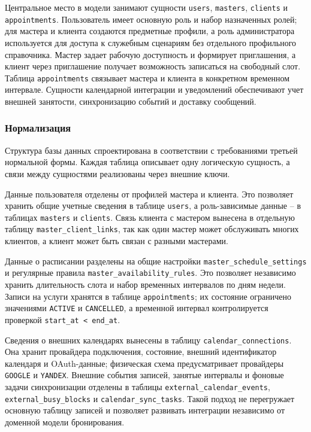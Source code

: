 Центральное место в модели занимают сущности \texttt{users}, \texttt{masters}, \texttt{clients} и \texttt{appointments}. Пользователь имеет основную роль и набор назначенных ролей; для мастера и клиента создаются предметные профили, а роль администратора используется для доступа к служебным сценариям без отдельного профильного справочника. Мастер задает рабочую доступность и формирует приглашения, а клиент через приглашение получает возможность записаться на свободный слот. Таблица \texttt{appointments} связывает мастера и клиента в конкретном временном интервале. Сущности календарной интеграции и уведомлений обеспечивают учет внешней занятости, синхронизацию событий и доставку сообщений.

\subsubsection{Нормализация}

Структура базы данных спроектирована в соответствии с требованиями третьей нормальной формы. Каждая таблица описывает одну логическую сущность, а связи между сущностями реализованы через внешние ключи.

Данные пользователя отделены от профилей мастера и клиента. Это позволяет хранить общие учетные сведения в таблице \texttt{users}, а роль-зависимые данные -- в таблицах \texttt{masters} и \texttt{clients}. Связь клиента с мастером вынесена в отдельную таблицу \texttt{master\_client\_links}, так как один мастер может обслуживать многих клиентов, а клиент может быть связан с разными мастерами.

Данные о расписании разделены на общие настройки \texttt{master\_schedule\_settings} и регулярные правила \texttt{master\_availability\_rules}. Это позволяет независимо хранить длительность слота и набор временных интервалов по дням недели. Записи на услуги хранятся в таблице \texttt{appointments}; их состояние ограничено значениями \texttt{ACTIVE} и \texttt{CANCELLED}, а временной интервал контролируется проверкой \texttt{start\_at < end\_at}.

Сведения о внешних календарях вынесены в таблицу \texttt{calendar\_connections}. Она хранит провайдера подключения, состояние, внешний идентификатор календаря и OAuth-данные; физическая схема предусматривает провайдеры \texttt{GOOGLE} и \texttt{YANDEX}. Внешние события записей, занятые интервалы и фоновые задачи синхронизации отделены в таблицы \texttt{external\_calendar\_events}, \texttt{external\_busy\_blocks} и \texttt{calendar\_sync\_tasks}. Такой подход не перегружает основную таблицу записей и позволяет развивать интеграции независимо от доменной модели бронирования.

